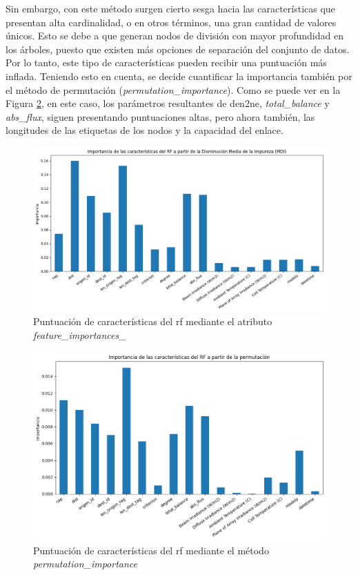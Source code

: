 Sin embargo, con este método surgen cierto sesga hacia las características que presentan alta cardinalidad, o en otros términos, una gran cantidad de valores únicos. Esto se debe a que generan nodos de división con mayor profundidad en los árboles, puesto que existen más opciones de separación del conjunto de datos. Por lo tanto, este tipo de características pueden recibir una puntuación más inflada. Teniendo esto en cuenta, se decide cuantificar la importancia también por el método de permutación (\textit{permutation\_importance}). Como se puede ver en la Figura \ref{fig:imp2}, en este caso, los parámetros resultantes de \gls{den2ne}, \textit{total\_balance} y \textit{abs\_flux}, siguen presentando puntuaciones altas, pero ahora también, las longitudes de las etiquetas de los nodos y la capacidad del enlace. \cite{importance}

\begin{figure}[H]
  \centering
  \includegraphics[width=1\textwidth]{img/desarrollo/rf/importance1.png}
  \caption{Puntuación de características del \acrshort{rf} mediante el atributo \textit{feature\_importances\_}}
  \label{fig:imp1}
\end{figure}

\begin{figure}[H]
  \centering
  \includegraphics[width=1\textwidth]{img/desarrollo/rf/importance2.png}
  \caption{Puntuación de características del \acrshort{rf} mediante el método \textit{permutation\_importance}}
  \label{fig:imp2}
\end{figure}

